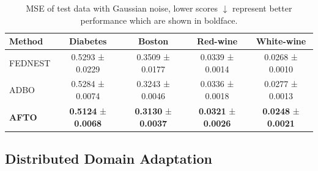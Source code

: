 \documentclass[letterpaper]{article} %
\begin{document}
\renewcommand\arraystretch{1}
\renewcommand\tabcolsep{10pt}
\begin{table}[t]
\centering
\renewcommand{\thetable}{\arabic{table}}
{
\begin{tabular}{l|c|c|c|c}
\toprule
 Method   & Diabetes   & Boston  & Red-wine & White-wine   \\ \hline
FEDNEST  &  0.5293 ± 0.0229 & 0.3509 ± 0.0177 &  0.0339 ± 0.0014  & 0.0268 ± 0.0010  \\
ADBO  &  0.5284 ± 0.0074 & 0.3243 ± 0.0046 & 0.0336 ± 0.0018 & 0.0277 ± 0.0013  \\ \hline
\textbf{AFTO} & \textbf{0.5124} ± \textbf{0.0068}  & \textbf{0.3130} ± \textbf{0.0037} & \textbf{0.0321} ± \textbf{0.0026} & \textbf{0.0248} ± \textbf{0.0021} \\

\bottomrule
\end{tabular}}
\caption{MSE of test data with Gaussian noise, lower scores $\downarrow$ represent better performance which are shown in boldface.}
\label{tab:ADBO-ATOP}
\end{table}



\subsection{Distributed Domain Adaptation}
\end{document}
